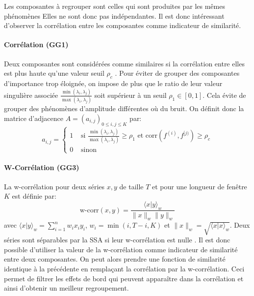 \documentclass{gretsi}
\newcommand{\inter}{\left[0, 1\right]}
\begin{document}
Les composantes à regrouper sont celles qui sont produites par les mêmes phénomènes
Elles ne sont donc pas indépendantes.
Il est donc intéressant d'observer la corrélation entre les composantes comme indicateur de similarité.

\paragraph{Corrélation (GG1)}\label{par:GG1}
    Deux composantes sont considérées comme similaires si la corrélation entre elles est plus haute qu'une valeur seuil $\rho_c$ \cite{abalov_14_auto}.
    Pour éviter de grouper des composantes d'importance trop éloignée, on impose de plus que le ratio de leur valeur singulière associée $\frac{\min(\lambda_i, \lambda_j)}{\max(\lambda_i, \lambda_j)}$ soit supérieur à un seuil $\rho_1 \in \inter$.
    Cela évite de grouper des phénomènes d'amplitude différentes où du bruit.
    On définit donc la matrice d'adjacence $A = (a_{i, j})_{0 \le i,j\le K}$ par:
    \begin{equation*}
        a_{i, j} = \begin{cases}
	        1 &\text{ si } \displaystyle\frac{\min(\lambda_i, \lambda_j)}{\max(\lambda_i, \lambda_j)} \ge \rho_1 \text{ et } \text{corr}(f^{(i)}, f^{[j)}) \ge \rho_c\\
	        0& \text{ sinon}
        \end{cases}
    \end{equation*}

\paragraph{W-Corrélation (GG3)}\label{par:GG3} 
    La w-corrélation pour deux séries $x, y$ de taille $T$ et pour une longueur de fenêtre $K$ est définie par:
    \begin{equation*}
        \text{w-corr}(x, y) = \frac{\langle x|y\rangle_w}{\|x\|_w\|y\|_w}
    \end{equation*}
    avec $\langle x|y\rangle_w = \sum_{i=1}^n w_i x_i y_i$, $w_i = \min(i, T-i, K)$ et $\|x\|_w = \sqrt{\langle x|x\rangle_w}$.
    Deux séries sont séparables par la SSA si leur w-corrélation est nulle \cite{Golyandina_10_ssa}.
    Il est donc possible d'utiliser la valeur de la w-corrélation comme indicateur de similarité entre deux composantes.
    On peut alors prendre une fonction de similarité identique à la précédente en remplaçant la corrélation par la w-corrélation.
    Ceci permet de filtrer les effets de bord qui peuvent apparaître dans la corrélation et ainsi d'obtenir un meilleur regroupement.
\end{document}
